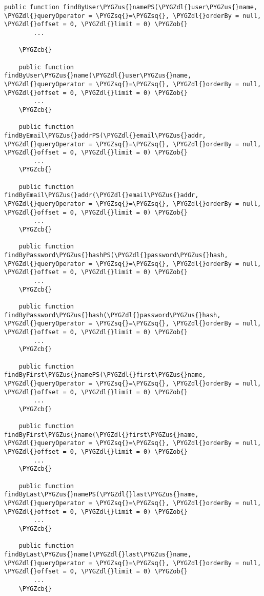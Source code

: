 \documentclass[letterpaper,10pt,english]{sphinxmanual}
\def\PYGZus{\char`\_}
\def\PYGZob{\char`\{}
\def\PYGZcb{\char`\}}
\def\PYGZdl{\char`\$}
\def\PYGZsq{\char`\'}
\renewcommand\PYGZsq{\textquotesingle}
\begin{document}
\begin{Verbatim}[commandchars=\\\{\}]
    public function findByUser\PYGZus{}namePS(\PYGZdl{}user\PYGZus{}name, \PYGZdl{}queryOperator = \PYGZsq{}=\PYGZsq{}, \PYGZdl{}orderBy = null, \PYGZdl{}offset = 0, \PYGZdl{}limit = 0) \PYGZob{}
        ...

    \PYGZcb{}

    public function findByUser\PYGZus{}name(\PYGZdl{}user\PYGZus{}name, \PYGZdl{}queryOperator = \PYGZsq{}=\PYGZsq{}, \PYGZdl{}orderBy = null, \PYGZdl{}offset = 0, \PYGZdl{}limit = 0) \PYGZob{}
        ...
    \PYGZcb{}

    public function findByEmail\PYGZus{}addrPS(\PYGZdl{}email\PYGZus{}addr, \PYGZdl{}queryOperator = \PYGZsq{}=\PYGZsq{}, \PYGZdl{}orderBy = null, \PYGZdl{}offset = 0, \PYGZdl{}limit = 0) \PYGZob{}
        ...
    \PYGZcb{}

    public function findByEmail\PYGZus{}addr(\PYGZdl{}email\PYGZus{}addr, \PYGZdl{}queryOperator = \PYGZsq{}=\PYGZsq{}, \PYGZdl{}orderBy = null, \PYGZdl{}offset = 0, \PYGZdl{}limit = 0) \PYGZob{}
        ...
    \PYGZcb{}

    public function findByPassword\PYGZus{}hashPS(\PYGZdl{}password\PYGZus{}hash, \PYGZdl{}queryOperator = \PYGZsq{}=\PYGZsq{}, \PYGZdl{}orderBy = null, \PYGZdl{}offset = 0, \PYGZdl{}limit = 0) \PYGZob{}
        ...
    \PYGZcb{}

    public function findByPassword\PYGZus{}hash(\PYGZdl{}password\PYGZus{}hash, \PYGZdl{}queryOperator = \PYGZsq{}=\PYGZsq{}, \PYGZdl{}orderBy = null, \PYGZdl{}offset = 0, \PYGZdl{}limit = 0) \PYGZob{}
        ...
    \PYGZcb{}

    public function findByFirst\PYGZus{}namePS(\PYGZdl{}first\PYGZus{}name, \PYGZdl{}queryOperator = \PYGZsq{}=\PYGZsq{}, \PYGZdl{}orderBy = null, \PYGZdl{}offset = 0, \PYGZdl{}limit = 0) \PYGZob{}
        ...
    \PYGZcb{}

    public function findByFirst\PYGZus{}name(\PYGZdl{}first\PYGZus{}name, \PYGZdl{}queryOperator = \PYGZsq{}=\PYGZsq{}, \PYGZdl{}orderBy = null, \PYGZdl{}offset = 0, \PYGZdl{}limit = 0) \PYGZob{}
        ...
    \PYGZcb{}

    public function findByLast\PYGZus{}namePS(\PYGZdl{}last\PYGZus{}name, \PYGZdl{}queryOperator = \PYGZsq{}=\PYGZsq{}, \PYGZdl{}orderBy = null, \PYGZdl{}offset = 0, \PYGZdl{}limit = 0) \PYGZob{}
        ...
    \PYGZcb{}

    public function findByLast\PYGZus{}name(\PYGZdl{}last\PYGZus{}name, \PYGZdl{}queryOperator = \PYGZsq{}=\PYGZsq{}, \PYGZdl{}orderBy = null, \PYGZdl{}offset = 0, \PYGZdl{}limit = 0) \PYGZob{}
        ...
    \PYGZcb{}


\end{Verbatim}
\end{document}
